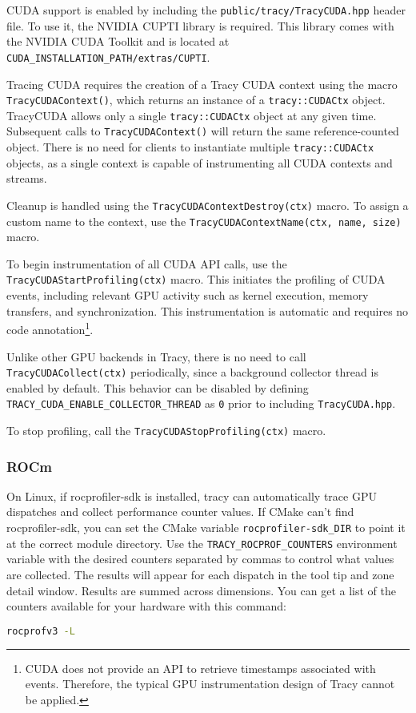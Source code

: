 \documentclass[hidelinks,titlepage,a4paper,twoside]{article}
\begin{document}
CUDA support is enabled by including the \texttt{public/tracy/TracyCUDA.hpp} header file. To use it, the NVIDIA CUPTI library is required. This library comes with the NVIDIA CUDA Toolkit and is located at \texttt{CUDA\_INSTALLATION\_PATH/extras/CUPTI}.

Tracing CUDA requires the creation of a Tracy CUDA context using the macro \texttt{TracyCUDAContext()}, which returns an instance of a \texttt{tracy::CUDACtx} object. TracyCUDA allows only a single \texttt{tracy::CUDACtx} object at any given time. Subsequent calls to \texttt{TracyCUDAContext()} will return the same reference-counted object. There is no need for clients to instantiate multiple \texttt{tracy::CUDACtx} objects, as a single context is capable of instrumenting all CUDA contexts and streams.

Cleanup is handled using the \texttt{TracyCUDAContextDestroy(ctx)} macro. To assign a custom name to the context, use the \texttt{TracyCUDAContextName(ctx, name, size)} macro.

To begin instrumentation of all CUDA API calls, use the \texttt{TracyCUDAStartProfiling(ctx)} macro. This initiates the profiling of CUDA events, including relevant GPU activity such as kernel execution, memory transfers, and synchronization. This instrumentation is automatic and requires no code annotation\footnote{CUDA does not provide an API to retrieve timestamps associated with events. Therefore, the typical GPU instrumentation design of Tracy cannot be applied.}.

Unlike other GPU backends in Tracy, there is no need to call \texttt{TracyCUDACollect(ctx)} periodically, since a background collector thread is enabled by default. This behavior can be disabled by defining \texttt{TRACY\_CUDA\_ENABLE\_COLLECTOR\_THREAD} as \texttt{0} prior to including \texttt{TracyCUDA.hpp}.

To stop profiling, call the \texttt{TracyCUDAStopProfiling(ctx)} macro.

\subsubsection{ROCm}

On Linux, if rocprofiler-sdk is installed, tracy can automatically trace GPU dispatches and collect
performance counter values. If CMake can't find rocprofiler-sdk, you can set the CMake variable
\texttt{rocprofiler-sdk\_DIR} to point it at the correct module directory. Use the
\texttt{TRACY\_ROCPROF\_COUNTERS} environment variable with the desired counters separated by commas
to control what values are collected. The results will appear for each dispatch in the tool tip and
zone detail window. Results are summed across dimensions. You can get a list of the counters
available for your hardware with this command:
\begin{lstlisting}[language=sh]
rocprofv3 -L
\end{lstlisting}
\end{document}

